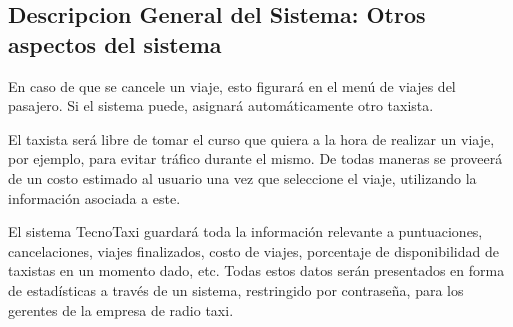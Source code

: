	\subsection{Descripcion General del Sistema: Otros aspectos del sistema}
	En caso de que se cancele un viaje, esto figurará en el menú de viajes del pasajero. Si el sistema puede, asignará automáticamente otro taxista.

	El taxista será libre de tomar el curso que quiera a la hora de realizar un viaje, por ejemplo, para evitar tráfico durante el mismo. De todas maneras se proveerá de un costo estimado al usuario una vez que seleccione el viaje, utilizando la información asociada a este.

	El sistema TecnoTaxi guardará toda la información relevante a puntuaciones, cancelaciones, viajes finalizados, costo de viajes, porcentaje de disponibilidad de taxistas en un momento dado, etc. Todas estos datos serán presentados en forma de estadísticas a través de un sistema, restringido por contraseña, para los gerentes de la empresa de radio taxi. 